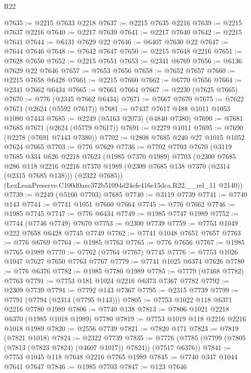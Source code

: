 \begin{lexlean}{R22}
\begin{coremodule}
@7635 := @2215 @7633 @2218
@7637 := @2215 @7635 @2216
@7639 := @2215 @7637 @2216
@7640 := @2217 @7639
@7641 := @2217 @7640
@7642 := @2215 @7641
@7644 := @6131 @7629 @22
@7646 := @6407 @7630 @22
@7647 := @7644 @7646
@7648 := @7642 @7647
@7650 := @2215 @7648 @2216
@7651 := @7628 @7650
@7652 := @2215 @7651
@7653 := @2341 @6769
@7656 := @6136 @7629 @22 @7646
@7657 := @7653 @7656
@7658 := @7652 @7657
@7660 := @2215 @7658 @6428
@7661 := @2215 @7660
@7662 := @6770 @7656
@7664 := @2341 @7662 @6434
@7665 := @7661 @7664
@7667 := @2230 (@7625 @7665)
@7670 := @776 (@2345 @7662 @6434)
@7671 := @7667 @7670
@7675 := @7622 @7671 (@2624 (@5592 @7617))
@7681 := @7437 @7617 @488 @1011 @1053 @1080 @7443
@7685 := @2249 (@5163 @2073) (@4840 @7380)
@7690 := @7681 @7685 @7671 (@2624 (@5779 @7617))
@7691 := @2279 @1011
@7695 := @7690 (@2278 (@7691 @7443 @7380))
@7702 := @2808 @7685 @240 @27 @1015 @1052 @7624 @7665
@7703 := @776 @7629
@7736 := @7702
    @7703
    @7670
    (@3119
      @7685
      @334
      @626
      @2218
      @7623
      (@1985 @7370 @1989)
      @7703
      (@2300
        @7685
        @286
        @118
        @2216
        @2216
        @7370
        @1989
        (@2309 @7685 @138 @7370 (@2314 (@2315 @7685 @138)))
        (@2322 @7685))
      (LexLeanPreserve.C100d0aec372b51094d24efe416e15dca.R22.__rel_11 @2140))
@7739 := @2249 (@5160 @7703) @7685
@7740 := @3119 @7739
@7741 := @7740 @143
@7744 := @7741 @1051 @7660 @7664
@7745 := @776 @7662
@7746 := @1985 @7745
@7747 := @776 @6434
@7749 := @1985 @7747 @1989
@7752 := @7744 (@7746 @7749) @7670
@7753 := @2300 @7739
@7759 := @7753 @1049 @222 @7658 @6428 @7745 @7749
@7762 := @7741 @1048 @7651 @7657
@7763 := @776 @6769
@7764 := @1985 @7763
@7765 := @776 @7656
@7767 := @1985 @7765 @1989
@7770 := @7762 (@7764 @7767) @7745
@7776 := @7753 @1026 @1047 @7627 @7650 @7763 @7767
@7779 := @7741 @1025 @6374 @7626
@7780 := @776 @6376
@7782 := @1985 @7780 @1989
@7785 := @7779 (@7468 @7782) @7763
@7791 := @7753 @181 @1024 @2216 @6373 @7367 @7782
@7792 := @2309 @7739
@7794 := @7792 @143 @7367
@7795 := @2315 @7739
@7799 := @7791 (@7794 (@2314 (@7795 @143)))
@7805 := @7753 @1022 @118 @6371 @2216 @7780 @1989
@7806 := @7740 @138
@7813 := @7806 @1021 @2218 @6370 (@1985 @1018 @1989) @7780
@7819 := @7753 @1019 @118 @2216 @2216 @1018 @1989
@7820 := @2556 @7739
@7821 := @7820 @171
@7823 := @7819 (@7821 @1018)
@7824 := @2322 @7739
@7835 := @7776 (@7785 (@7799 (@7805 (@7813 (@7823 @7824) (@4607 @1017)) @7824)) (@7517 @6376))
@7841 := @7753 @1045 @118 @7648 @2216 @7765 @1989
@7845 := @7740 @347 @1044 @7641 @7647
@7846 := @1985 @7703
@7847 := @123 @7646

\end{coremodule}
\end{lexlean}

